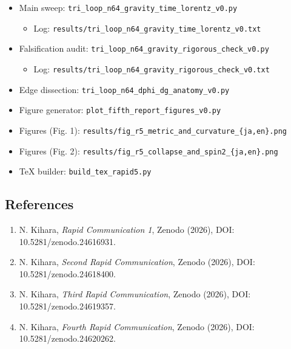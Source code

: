 \documentclass[
  a4paper,
]{article}
\providecommand{\tightlist}{%
  \setlength{\itemsep}{0pt}\setlength{\parskip}{0pt}}
\begin{document}
\begin{itemize}
\tightlist
\item
  Main sweep: \texttt{tri\_loop\_n64\_gravity\_time\_lorentz\_v0.py}

  \begin{itemize}
  \tightlist
  \item
    Log: \texttt{results/tri\_loop\_n64\_gravity\_time\_lorentz\_v0.txt}
  \end{itemize}
\item
  Falsification audit:
  \texttt{tri\_loop\_n64\_gravity\_rigorous\_check\_v0.py}

  \begin{itemize}
  \tightlist
  \item
    Log:
    \texttt{results/tri\_loop\_n64\_gravity\_rigorous\_check\_v0.txt}
  \end{itemize}
\item
  Edge dissection: \texttt{tri\_loop\_n64\_dphi\_dg\_anatomy\_v0.py}
\item
  Figure generator: \texttt{plot\_fifth\_report\_figures\_v0.py}
\item
  Figures (Fig. 1):
  \texttt{results/fig\_r5\_metric\_and\_curvature\_\{ja,en\}.png}
\item
  Figures (Fig. 2):
  \texttt{results/fig\_r5\_collapse\_and\_spin2\_\{ja,en\}.png}
\item
  TeX builder: \texttt{build\_tex\_rapid5.py}
\end{itemize}

\subsection{References}\label{references}

\begin{enumerate}
\def\labelenumi{\arabic{enumi}.}
\tightlist
\item
  N. Kihara, \emph{Rapid Communication 1}, Zenodo (2026), DOI:
  10.5281/zenodo.24616931.
\item
  N. Kihara, \emph{Second Rapid Communication}, Zenodo (2026), DOI:
  10.5281/zenodo.24618400.
\item
  N. Kihara, \emph{Third Rapid Communication}, Zenodo (2026), DOI:
  10.5281/zenodo.24619357.
\item
  N. Kihara, \emph{Fourth Rapid Communication}, Zenodo (2026), DOI:
  10.5281/zenodo.24620262.
\end{enumerate}
\end{document}
